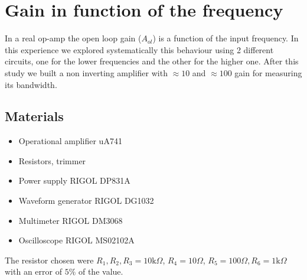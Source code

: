 \chapter{Gain in function of the frequency}
In a real op-amp the open loop gain ($A_{ol}$) is a function of the input frequency. In this experience we explored systematically this behaviour using 2 different circuits, one for the lower frequencies and the other for the higher one. After this study we built a non inverting amplifier with $\approx 10$ and $\approx 100$ gain for measuring its bandwidth.

\section{Materials}
\begin{itemize}
\item Operational amplifier uA741
\item Resistors, trimmer
\item Power supply RIGOL DP831A
\item Waveform generator RIGOL DG1032
\item Multimeter RIGOL DM3068
\item Oscilloscope RIGOL MS02102A
\end{itemize}
The resistor chosen were $R_1, R_2, R_3 = 10\text{k} \Omega$, $R_4 = 10 \Omega$, $R_5 = 100 \Omega, R_6 = 1\text{k}\Omega$ with an error of $5\%$ of the value.
